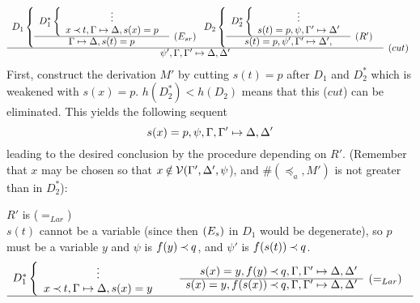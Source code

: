 \begin{PROOF}
\begin{LS}
\begin{LSA}
\begin{LSB}
\begin{LSC}
{\[\begin{array}{cl}
D_1 \left \{ \begin{array}{cl}
 D_1^*\left\{ \begin{array}{cl}
  \vdots \\ 
  x\Incl t,\Gamma\Seq\Delta, s(x)= p  
 \end{array} \right. \\ \cline{1-1}
\Gamma\Seq\Delta, s(t)= p & \rabove{\Esr}
 \end{array} \right .
 D_2\left\{ \begin{array}{cl}
  D_2^* \left \{ \begin{array}{c}
\vdots \\
s(t)= p, \psi, \Gamma'\Seq\Delta' \end{array} \right .
\\ \cline{1-1}  
s(t)= p, \psi', \Gamma'\Seq\Delta',  & \raisebox{1.2ex}[1.5ex][0ex]{($R'$)}
 \end{array} \right. \\ \cline{1-1}
\psi', \Gamma,\Gamma' \Seq \Delta,\Delta'
 &   \raisebox{1.2ex}[1.5ex][0ex]{($cut$)}
\end{array} \] }
First, construct the derivation $M'$ by cutting $s(t)=p$ after $D_1$ and
 $D_2^*$ which is weakened with $s(x)=p$. $h(D_2^*)<h(D_2)$ means that this ($cut$)
 can be eliminated. This
yields the following sequent
\[  s(x)=p, \psi, \Gamma, \Gamma' \mathrel{\mapsto} \Delta, \Delta' \]
leading to the desired conclusion by the procedure depending on
 $R'$. (Remember that $x$ may be chosen so
that $x\Not\in\Vars(\Gamma',\Delta',\psi$), and $\#(\preceq_a,M')$ is not
greater than in $D_2^*$):
\begin{LSD}
\item $R'$ is ($=_{Lar}$)\\
 $s(t)$ cannot be a variable (since then $(E_{s})$ in $D_1$ would be
 degenerate), so $p$ must be a variable $y$ and $\psi$ is $f(y)\mathbin{\prec} q$, and $\psi'$ is $f(s(t))\mathbin{\prec} q$.
\[ \begin{array}{cl}
D_1^* \left \{ \begin{array}{c} \vdots \\ 
   x \Incl t, \GSD, s(x)=y \end{array} \right . \ \ \ \ \ 
\begin{array}{rl}
 s(x)=y, f(y)\Incl q, \Gamma, \Gamma' \Seq \Delta, \Delta' \\
 \cline{1-1}
 s(x)=y, f(s(x))\Incl q, \Gamma, \Gamma' \Seq \Delta, \Delta' 
 &   \raisebox{1.2ex}[1.5ex][0ex]{($=_{Lar}$)}  
 \end{array} \\ \cline{1-1}

\end{array}\]
\end{LSD}
\end{LSC}
\end{LSB}
\end{LSA}
\end{LS}
\end{PROOF}
